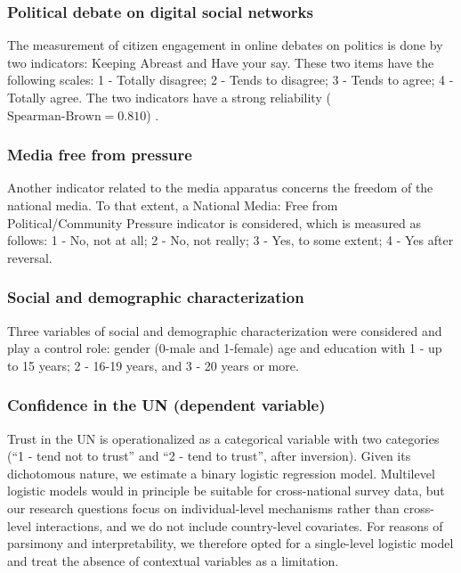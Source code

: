 \documentclass[english]{textolivre}
\begin{document}
\subsubsection{Political debate on digital social networks}
The measurement of citizen engagement in online debates on politics is done by two indicators: Keeping Abreast and Have your say. These two items have the following scales: 1 - Totally disagree; 2 - Tends to disagree; 3 - Tends to agree; 4 - Totally agree. The two indicators have a strong reliability ($\text{Spearman-Brown} = 0.810$) \cite{kline2011}.

\subsubsection{Media free from pressure}
Another indicator related to the media apparatus concerns the freedom of the national media. To that extent, a National Media: Free from Political/Community Pressure indicator is considered, which is measured as follows: 1 - No, not at all; 2 - No, not really; 3 - Yes, to some extent; 4 - Yes after reversal.

\subsubsection{Social and demographic characterization}
Three variables of social and demographic characterization were considered and play a control role: gender (0-male and 1-female) age and education with 1 - up to 15 years; 2 - 16-19 years, and 3 - 20 years or more.

\subsubsection{Confidence in the UN (dependent variable)}
Trust in the UN is operationalized as a categorical variable with two categories (``1 - tend not to trust'' and ``2 - tend to trust'', after inversion). Given its dichotomous nature, we estimate a binary logistic regression model. Multilevel logistic models would in principle be suitable for cross-national survey data, but our research questions focus on individual-level mechanisms rather than cross-level interactions, and we do not include country-level covariates. For reasons of parsimony and interpretability, we therefore opted for a single-level logistic model and treat the absence of contextual variables as a limitation.
\end{document}
